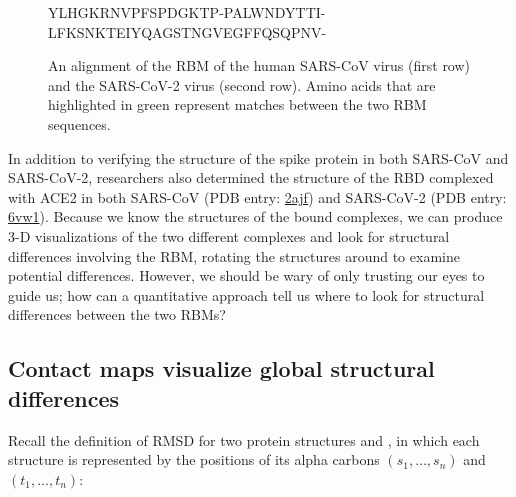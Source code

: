 \begin{figure}[h]
	\centering
	\mySfFamily
	\begin{sequence}[0.58]%
	YLHGKRNVPFSPDGKTP-PALWNDYTTI-\\
	LFKSNKTEIYQAGSTNGVEGFFQSQPNV-
	\end{sequence}
	\caption{An alignment of the RBM of the human SARS-CoV virus (first row) and the SARS-CoV-2 virus (second row). Amino acids that are highlighted in green represent matches between the two RBM sequences.}
	\label{fig:RBM_alignment}
\end{figure}

In addition to verifying the structure of the spike protein in both SARS-CoV and SARS-CoV-2, researchers also determined the structure of the RBD complexed with ACE2 in both SARS-CoV (PDB entry: \href{https://www.rcsb.org/structure/2ajf}{2ajf}) and SARS-CoV-2 (PDB entry: \href{https://www.rcsb.org/structure/6vw1}{6vw1}). Because we know the structures of the bound complexes, we can produce 3-D visualizations of the two different complexes and look for structural differences involving the RBM, rotating the structures around to examine potential differences. However, we should be wary of only trusting our eyes to guide us; how can a quantitative approach tell us where to look for structural differences between the two RBMs?\\

\begin{note}\end{note}

\FloatBarrier
{}
\subsection{Contact maps visualize global structural differences}

Recall the definition of RMSD for two protein structures  and , in which each structure is represented by the positions of its  alpha carbons $(s_{1}, \ldots, s_{n})$ and $(t_{1}, \ldots, t_{n})$:

